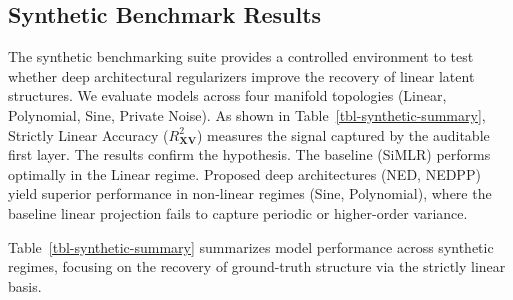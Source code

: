 \documentclass[
  letterpaper,
]{report}
\begin{document}
\subsection{Synthetic Benchmark
Results}\label{synthetic-benchmark-results}

The synthetic benchmarking suite provides a controlled environment to
test whether deep architectural regularizers improve the recovery of
linear latent structures. We evaluate models across four manifold
topologies (Linear, Polynomial, Sine, Private Noise). As shown in
Table~\ref{tbl-synthetic-summary}, Strictly Linear Accuracy
(\(R^2_{\mathbf{X}\mathbf{V}}\)) measures the signal captured by the
auditable first layer. The results confirm the hypothesis. The baseline
(SiMLR) performs optimally in the Linear regime. Proposed deep
architectures (NED, NEDPP) yield superior performance in non-linear
regimes (Sine, Polynomial), where the baseline linear projection fails
to capture periodic or higher-order variance.

Table~\ref{tbl-synthetic-summary} summarizes model performance across
synthetic regimes, focusing on the recovery of ground-truth structure
via the strictly linear basis.
\end{document}
